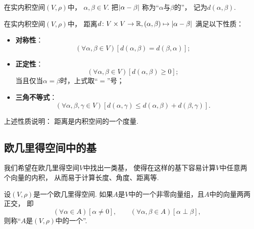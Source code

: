 \begin{definition}
在实内积空间\((V,\rho)\)中，
\(\alpha,\beta \in V\).
把\(\abs{\alpha-\beta}\)
称为“\(\alpha\)与\(\beta\)的”，
记为\(d(\alpha,\beta)\).
\end{definition}

\begin{property}
在实内积空间\((V,\rho)\)中，
距离\(
	d\colon V \times V \to \mathbb{R},
	(\alpha,\beta) \mapsto \abs{\alpha-\beta}
\)
满足以下性质：\begin{itemize}
	\item {\rm\bf 对称性}：\begin{equation*}
		(\forall \alpha,\beta \in V)
		[
			d(\alpha,\beta) = d(\beta,\alpha)
		];
	\end{equation*}

	\item {\rm\bf 正定性}：\begin{equation*}
		(\forall \alpha,\beta \in V)
		[
			d(\alpha,\beta) \geq 0
		];
	\end{equation*}
	当且仅当\(\alpha = \beta\)时，上式取“\(=\)”号；

	\item {\rm\bf 三角不等式}：\begin{equation*}
		(\forall \alpha,\beta,\gamma \in V)
		[
			d(\alpha,\gamma) \leq d(\alpha,\beta) + d(\beta,\gamma)
		].
	\end{equation*}
\end{itemize}
\end{property}
\begin{remark}
上述性质说明：
距离是内积空间的一个度量.
\end{remark}

\subsection{欧几里得空间中的基}
我们希望在欧几里得空间\(V\)中找出一类基，
使得在这样的基下容易计算\(V\)中任意两个向量的内积，
从而易于计算长度、角度、距离等.

\begin{definition}
设\((V,\rho)\)是一个欧几里得空间.
如果\(A\)是\(V\)中的一个非零向量组，且\(A\)中的向量两两正交，
即\begin{equation*}
	(\forall \alpha \in A)
	[\alpha\neq0],
	\qquad
	(\forall \alpha,\beta \in A)
	[\alpha \perp \beta],
\end{equation*}
则称“\(A\)是\((V,\rho)\)中的一个”.
\end{definition}

